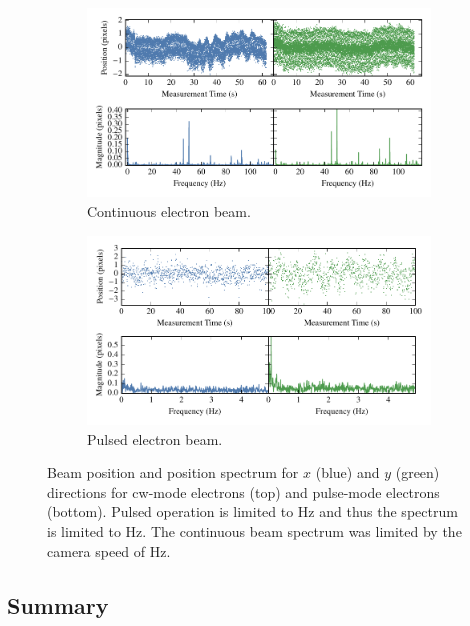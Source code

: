 \begin{figure}
    \begin{subfigure}{\linewidth}
    \centering
    \includegraphics{part2/Figs/cw_beam_stability.pdf}
    \caption{Continuous electron beam.}
    \label{figure:cw_stability}
    \end{subfigure}

    \begin{subfigure}{\linewidth}
    \centering
    \includegraphics{part2/Figs/pulse_beam_stability.pdf}
    \caption{Pulsed electron beam.}
    \label{figure:pulse_stability}
    \end{subfigure}
    \caption[Beam stability for continuous and pulsed operation.]{Beam position and position spectrum for $x$ (blue) and $y$ (green) directions for \gls{cw}-mode electrons (top) and pulse-mode electrons (bottom).
    Pulsed operation is limited to \unit[10]{Hz} and thus the spectrum is limited to \unit[5]{Hz}. The continuous beam spectrum was limited by the camera speed of \unit[240]{Hz}.}
    \label{figure:stability}
\end{figure}

\subsection{Summary}

